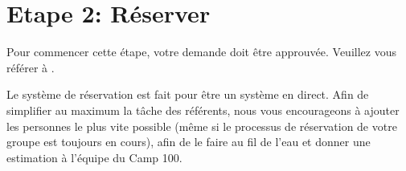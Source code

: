 \documentclass[a4paper, 11pt]{report}
\begin{document}
\chapter{Etape 2: R\'eserver}
\label{chap:booking}

Pour commencer cette \'etape, votre demande doit \^etre approuv\'ee. Veuillez vous r\'ef\'erer \`a .

Le syst\`eme de r\'eservation est fait pour \^etre un syst\`eme en direct. Afin de simplifier au maximum la t\^ache des r\'ef\'erents, nous vous encourageons \`a ajouter les personnes le plus vite possible (m\^eme si le processus de r\'eservation de votre groupe est toujours en cours), afin de le faire au fil de l'eau et donner une estimation \`a l'\'equipe du Camp 100.
\end{document}
